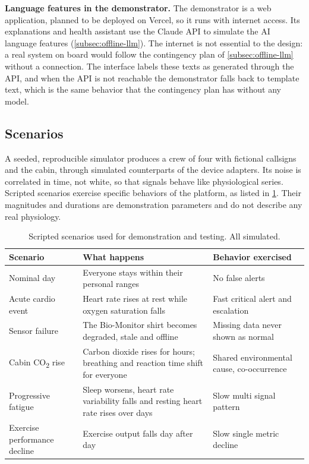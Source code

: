 \medskip\noindent\textbf{Language features in the demonstrator.} The demonstrator is a web application, planned to be deployed on Vercel, so it runs with internet access. Its explanations and health assistant use the Claude API to simulate the AI language features (\ref{subsec:offline-llm}). The internet is not essential to the design: a real system on board would follow the contingency plan of \ref{subsec:offline-llm} without a connection. The interface labels these texts as generated through the API, and when the API is not reachable the demonstrator falls back to template text, which is the same behavior that the contingency plan has without any model.

\subsection{Scenarios}
\label{subsec:scenarios}

A seeded, reproducible simulator produces a crew of four with fictional callsigns and the cabin, through simulated counterparts of the device adapters. Its noise is correlated in time, not white, so that signals behave like physiological series. Scripted scenarios exercise specific behaviors of the platform, as listed in \ref{tab:scenarios}. Their magnitudes and durations are demonstration parameters and do not describe any real physiology.

\begin{table}[htbp]
\centering
\vspace{0.8em}
\caption{Scripted scenarios used for demonstration and testing. All simulated.}
\label{tab:scenarios}
\small
\begin{tabular}{p{3.4cm}p{6.4cm}p{4.2cm}}
\hline
\textbf{Scenario} & \textbf{What happens} & \textbf{Behavior exercised} \\
\hline
Nominal day & Everyone stays within their personal ranges & No false alerts \\
Acute cardio event & Heart rate rises at rest while oxygen saturation falls & Fast critical alert and escalation \\
Sensor failure & The Bio-Monitor shirt becomes degraded, stale and offline & Missing data never shown as normal \\
Cabin CO\textsubscript{2} rise & Carbon dioxide rises for hours; breathing and reaction time shift for everyone & Shared environmental cause, co-occurrence \\
Progressive fatigue & Sleep worsens, heart rate variability falls and resting heart rate rises over days & Slow multi signal pattern \\
Exercise performance decline & Exercise output falls day after day & Slow single metric decline \\
\hline
\end{tabular}
\vspace{1.2em}
\end{table}

